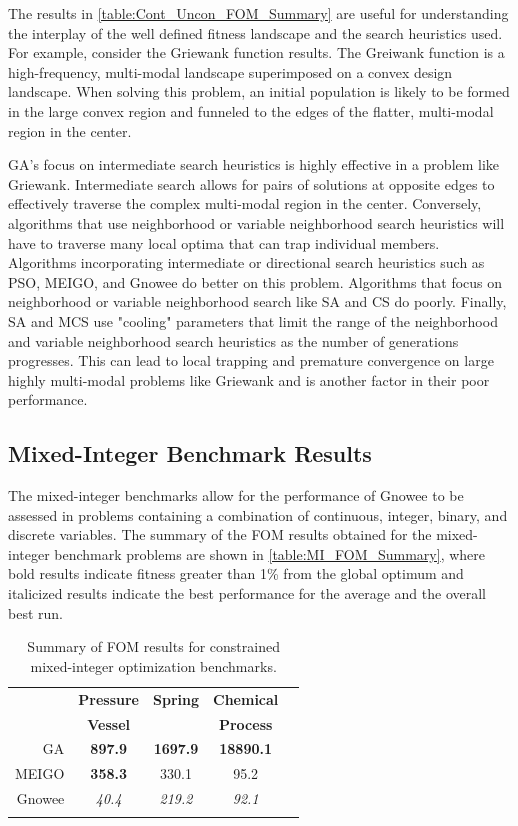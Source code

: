 \documentclass{article}                                                                           %
\begin{document}
The results in \autoref{table:Cont_Uncon_FOM_Summary} are useful for understanding the interplay of the well defined fitness landscape and the search heuristics used.
For example, consider the Griewank function results.
The Greiwank function is a high-frequency, multi-modal landscape superimposed on a convex design landscape.
When solving this problem, an initial population is likely to be formed in the large convex region and funneled to the edges of the flatter, multi-modal region in the center.

GA's focus on intermediate search heuristics is highly effective in a problem like Griewank.
Intermediate search allows for pairs of solutions at opposite edges to effectively traverse the complex multi-modal region in the center.
Conversely, algorithms that use neighborhood or variable neighborhood search heuristics will have to traverse many local optima that can trap individual members.
Algorithms incorporating intermediate or directional search heuristics such as PSO, MEIGO, and Gnowee do better on this problem.
Algorithms that focus on neighborhood or variable neighborhood search like SA and CS do poorly.
Finally, SA and MCS use "cooling" parameters that limit the range of the neighborhood and variable neighborhood search heuristics as the number of generations progresses.
This can lead to local trapping and premature convergence on large highly multi-modal problems like Griewank and is another factor in their poor performance.   
  
\subsection{Mixed-Integer Benchmark Results}
The mixed-integer benchmarks allow for the performance of Gnowee to be assessed in problems containing a combination of continuous, integer, binary, and discrete variables.
The summary of the FOM results obtained for the mixed-integer benchmark problems are shown in \autoref{table:MI_FOM_Summary}, where bold results indicate fitness greater than 1\% from the global optimum and italicized results indicate the best performance for the average and the overall best run.

\begin{table}[!t]
\centering
\caption{Summary of FOM results for constrained mixed-integer optimization benchmarks.} 
\label{table:MI_FOM_Summary}
\begin{tabular}{r c c c c} 
\toprule
\textbf{} & \textbf{Pressure} & \textbf{Spring \cite{Lampinen1999}} & \textbf{Chemical} \\
& \textbf{Vessel \cite{Cagnina2008}} &  & \textbf{Process \cite{Yiqing2007}}  \\
\midrule
GA\cite{Mathworks2015} & \textbf{897.9} & \textbf{1697.9} & \textbf{18890.1} \\ \addlinespace
MEIGO\cite{Egea2014} & \textbf{358.3} & 330.1  & 95.2 \\ \addlinespace
Gnowee & \textit{40.4} & \textit{219.2} & \textit{92.1} \\ \addlinespace
\bottomrule
\end{tabular}
\end{table}
\end{document}
